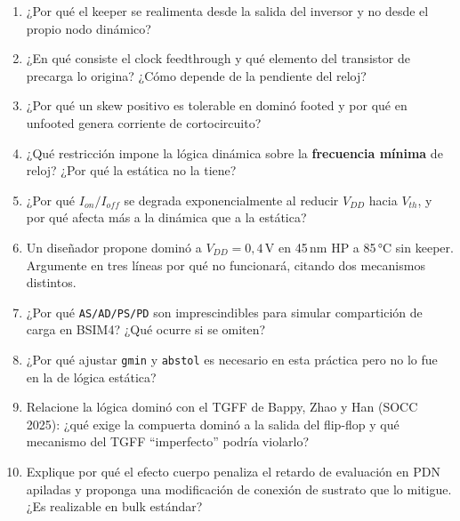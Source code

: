 \documentclass[11pt,a4paper]{article}
\begin{document}
\begin{enumerate}[nosep,leftmargin=*]
\item ¿Por qué el keeper se realimenta desde la salida del inversor y no desde el propio nodo dinámico?
\item ¿En qué consiste el clock feedthrough y qué elemento del transistor de precarga lo origina? ¿Cómo depende de la pendiente del reloj?
\item ¿Por qué un skew positivo es tolerable en dominó footed y por qué en unfooted genera corriente de cortocircuito?
\item ¿Qué restricción impone la lógica dinámica sobre la \textbf{frecuencia mínima} de reloj? ¿Por qué la estática no la tiene?
\item ¿Por qué $I_{on}/I_{off}$ se degrada exponencialmente al reducir $V_{DD}$ hacia $V_{th}$, y por qué afecta más a la dinámica que a la estática?
\item Un diseñador propone dominó a $V_{DD}=0{,}4$\,V en 45\,nm HP a 85\,°C sin keeper. Argumente en tres líneas por qué no funcionará, citando dos mecanismos distintos.
\item ¿Por qué \texttt{AS/AD/PS/PD} son imprescindibles para simular compartición de carga en BSIM4? ¿Qué ocurre si se omiten?
\item ¿Por qué ajustar \texttt{gmin} y \texttt{abstol} es necesario en esta práctica pero no lo fue en la de lógica estática?
\item Relacione la lógica dominó con el TGFF de Bappy, Zhao y Han (SOCC 2025): ¿qué exige la compuerta dominó a la salida del flip-flop y qué mecanismo del TGFF ``imperfecto'' podría violarlo?
\item Explique por qué el efecto cuerpo penaliza el retardo de evaluación en PDN apiladas y proponga una modificación de conexión de sustrato que lo mitigue. ¿Es realizable en bulk estándar?
\end{enumerate}

\end{document}

